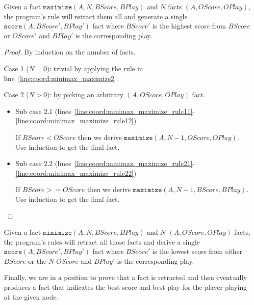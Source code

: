 \begin{lemma}
Given a fact $\mathtt{maximize}(A, N, BScore, BPlay)$ and $N$ facts
$(A, OScore, OPlay)$, the program's rule will retract
them all and generate a single 
$\mathtt{score}(A, BScore', BPlay')$ fact where $BScore'$ is the
highest score from $BScore$ or $OScore'$ and
$BPlay'$ is the corresponding play.
\end{lemma}
\begin{proof}
By induction on the number of  facts.

Case 1 ($N = 0$): trivial by applying the rule in
line~\ref{line:coord:minimax_maximize2}.

Case 2 ($N > 0$): by picking an arbitrary $(A, OScore,
OPlay)$ fact.

\begin{itemize}
   \item Sub case 2.1
      (lines~\ref{line:coord:minimax_maximize_rule11}-\ref{line:coord:minimax_maximize_rule12})

      If $BScore < OScore$ then we derive $\mathtt{maximize}(A, N-1,
      OScore, OPlay)$. Use induction to get the final  fact.

   \item Sub case 2.2
      (lines~\ref{line:coord:minimax_maximize_rule21}-\ref{line:coord:minimax_maximize_rule22})

      If $BScore >= OScore$ then we derive $\mathtt{maximize}(A, N-1,
      BScore, BPlay)$. Use induction to get the final  fact.

\end{itemize}

\end{proof}

\begin{lemma}

Given a fact $\mathtt{minimize}(A, N, BScore, BPlay)$ and $N$
$(A, OScore, OPlay)$ facts, the program's rules will retract all
those facts and derive a single $\mathtt{score}(A, BScore', BPlay')$ fact
where $BScore'$ is the lowest score from either $BScore$ or the $N$
$OScore$ and $BPlay'$ is the corresponding play.

\end{lemma}

Finally, we are in a position to prove that a  fact is retracted and
then eventually produces a  fact that indicates the best score and
best play for the player playing at the given node.

